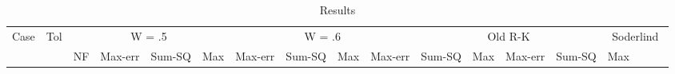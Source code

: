 \documentclass[11pt,a4paper]{article}
\begin{document}

  \begin{sidewaystable}[t]
    \caption{Results}
    \centering
    \begin{tabular}{rr*{16}{c}}
      Case & Tol & \multicolumn{4}{c}{W = .5} & \multicolumn{4}{c}{W = .6} & \multicolumn{4}{c}{Old R-K} & \multicolumn{4}{c}{Soderlind} \\
      & & NF & Max-err & Sum-SQ & Max & Max-err & Sum-SQ & Max & Max-err & Sum-SQ & Max & Max-err & Sum-SQ & Max \\
    \end{tabular}
  \end{sidewaystable}

\end{document}
